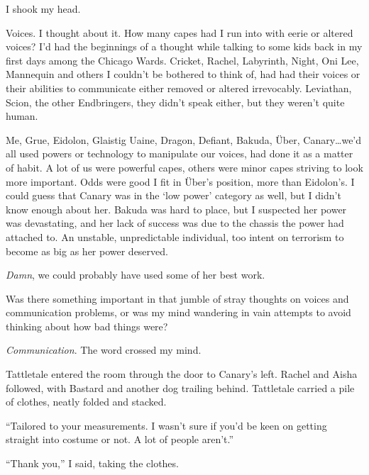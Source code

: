 I shook my head.



Voices.  I thought about it.  How many capes had I run into with eerie or altered voices?  I'd had the beginnings of a thought while talking to some kids  back in my first days among the Chicago Wards.  Cricket, Rachel, Labyrinth, Night, Oni Lee, Mannequin and others I couldn't be bothered to think of, had had their voices or their abilities to communicate either removed or altered irrevocably.  Leviathan, Scion, the other Endbringers, they didn't speak either, but they weren't quite human.



Me, Grue, Eidolon, Glaistig Uaine, Dragon, Defiant, Bakuda, \"{U}ber, Canary\ldots we'd all used powers or technology to manipulate our voices, had done it as a matter of habit.  A lot of us were powerful capes, others were minor capes striving to look more important.  Odds were good I fit in \"{U}ber's position, more than Eidolon's.  I could guess that Canary was in the `low power' category as well, but I didn't know enough about her.  Bakuda was hard to place, but I suspected her power was devastating, and her lack of success was due to the chassis the power had attached to.  An unstable, unpredictable individual, too intent on terrorism to become as big as her power deserved.



\emph{Damn}, we could probably have used some of her best work.



Was there something important in that jumble of stray thoughts on voices and communication problems, or was my mind wandering in vain attempts to avoid thinking about how bad things were?



\emph{Communication}.  The word crossed my mind.



Tattletale entered the room through the door to Canary's left.  Rachel and Aisha followed, with Bastard and another dog trailing behind.  Tattletale carried a pile of clothes, neatly folded and stacked.



``Tailored to your measurements.  I wasn't sure if you'd be keen on getting straight into costume or not.  A lot of people aren't.''



``Thank you,'' I said, taking the clothes.



